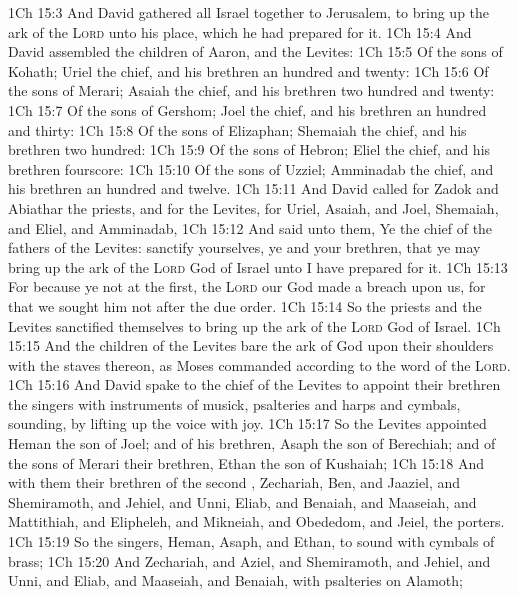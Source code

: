 \vs 1Ch 15:3 And David gathered all Israel together to Jerusalem, to bring up the ark of the \textsc{Lord} unto his place, which he had prepared for it.
\vs 1Ch 15:4 And David assembled the children of Aaron, and the Levites:
\vs 1Ch 15:5 Of the sons of Kohath; Uriel the chief, and his brethren an hundred and twenty:
\vs 1Ch 15:6 Of the sons of Merari; Asaiah the chief, and his brethren two hundred and twenty:
\vs 1Ch 15:7 Of the sons of Gershom; Joel the chief, and his brethren an hundred and thirty:
\vs 1Ch 15:8 Of the sons of Elizaphan; Shemaiah the chief, and his brethren two hundred:
\vs 1Ch 15:9 Of the sons of Hebron; Eliel the chief, and his brethren fourscore:
\vs 1Ch 15:10 Of the sons of Uzziel; Amminadab the chief, and his brethren an hundred and twelve.
\vs 1Ch 15:11 And David called for Zadok and Abiathar the priests, and for the Levites, for Uriel, Asaiah, and Joel, Shemaiah, and Eliel, and Amminadab,
\vs 1Ch 15:12 And said unto them, Ye  the chief of the fathers of the Levites: sanctify yourselves,  ye and your brethren, that ye may bring up the ark of the \textsc{Lord} God of Israel unto  I have prepared for it.
\vs 1Ch 15:13 For because ye  not at the first, the \textsc{Lord} our God made a breach upon us, for that we sought him not after the due order.
\vs 1Ch 15:14 So the priests and the Levites sanctified themselves to bring up the ark of the \textsc{Lord} God of Israel.
\vs 1Ch 15:15 And the children of the Levites bare the ark of God upon their shoulders with the staves thereon, as Moses commanded according to the word of the \textsc{Lord}.
\vs 1Ch 15:16 And David spake to the chief of the Levites to appoint their brethren  the singers with instruments of musick, psalteries and harps and cymbals, sounding, by lifting up the voice with joy.
\vs 1Ch 15:17 So the Levites appointed Heman the son of Joel; and of his brethren, Asaph the son of Berechiah; and of the sons of Merari their brethren, Ethan the son of Kushaiah;
\vs 1Ch 15:18 And with them their brethren of the second , Zechariah, Ben, and Jaaziel, and Shemiramoth, and Jehiel, and Unni, Eliab, and Benaiah, and Maaseiah, and Mattithiah, and Elipheleh, and Mikneiah, and Obededom, and Jeiel, the porters.
\vs 1Ch 15:19 So the singers, Heman, Asaph, and Ethan,  to sound with cymbals of brass;
\vs 1Ch 15:20 And Zechariah, and Aziel, and Shemiramoth, and Jehiel, and Unni, and Eliab, and Maaseiah, and Benaiah, with psalteries on Alamoth;
